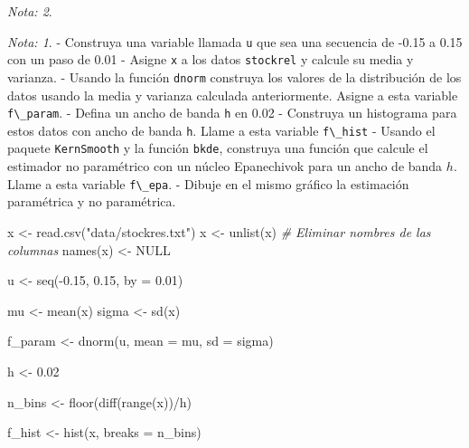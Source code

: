 \documentclass[
  12pt,
]{book}
\newenvironment{Shaded}{\begin{snugshade}}{\end{snugshade}}
\newcommand{\AttributeTok}[1]{\textcolor[rgb]{0.77,0.63,0.00}{#1}}
\newcommand{\CommentTok}[1]{\textcolor[rgb]{0.56,0.35,0.01}{\textit{#1}}}
\newcommand{\ConstantTok}[1]{\textcolor[rgb]{0.00,0.00,0.00}{#1}}
\newcommand{\FloatTok}[1]{\textcolor[rgb]{0.00,0.00,0.81}{#1}}
\newcommand{\FunctionTok}[1]{\textcolor[rgb]{0.00,0.00,0.00}{#1}}
\newcommand{\NormalTok}[1]{#1}
\newcommand{\OtherTok}[1]{\textcolor[rgb]{0.56,0.35,0.01}{#1}}
\newcommand{\SpecialCharTok}[1]{\textcolor[rgb]{0.00,0.00,0.00}{#1}}
\newcommand{\StringTok}[1]{\textcolor[rgb]{0.31,0.60,0.02}{#1}}
\theoremstyle{definition}
\theoremstyle{definition}
\theoremstyle{definition}
\theoremstyle{remark}
\newtheorem*{remark}{Nota: }
\begin{document}
\begin{remark}
\begin{remark}

{}
- Construya una variable llamada \texttt{u} que sea una secuencia de -0.15 a 0.15 con un paso de 0.01
- Asigne \texttt{x} a los datos \texttt{stockrel} y calcule su media y varianza.
- Usando la función \texttt{dnorm} construya los valores de la distribución de los datos usando la media y varianza calculada anteriormente. Asigne a esta variable \texttt{f\textbackslash{}\_param}.
- Defina un ancho de banda \texttt{h} en 0.02
- Construya un histograma para estos datos con ancho de banda \texttt{h}. Llame a esta variable \texttt{f\textbackslash{}\_hist}
- Usando el paquete \texttt{KernSmooth} y la función \texttt{bkde}, construya una función que calcule el estimador no paramétrico con un núcleo Epanechivok para un ancho de banda \(h\). Llame a esta variable \texttt{f\textbackslash{}\_epa}.
- Dibuje en el mismo gráfico la estimación paramétrica y no paramétrica.

\end{remark}
\end{remark}

\begin{Shaded}
\begin{Highlighting}[]
\NormalTok{x }\OtherTok{\textless{}{-}} \FunctionTok{read.csv}\NormalTok{(}\StringTok{"data/stockres.txt"}\NormalTok{)}
\NormalTok{x }\OtherTok{\textless{}{-}} \FunctionTok{unlist}\NormalTok{(x)}
\CommentTok{\# Eliminar nombres de las columnas}
\FunctionTok{names}\NormalTok{(x) }\OtherTok{\textless{}{-}} \ConstantTok{NULL}

\NormalTok{u }\OtherTok{\textless{}{-}} \FunctionTok{seq}\NormalTok{(}\SpecialCharTok{{-}}\FloatTok{0.15}\NormalTok{, }\FloatTok{0.15}\NormalTok{, }\AttributeTok{by =} \FloatTok{0.01}\NormalTok{)}

\NormalTok{mu }\OtherTok{\textless{}{-}} \FunctionTok{mean}\NormalTok{(x)}
\NormalTok{sigma }\OtherTok{\textless{}{-}} \FunctionTok{sd}\NormalTok{(x)}

\NormalTok{f\_param }\OtherTok{\textless{}{-}} \FunctionTok{dnorm}\NormalTok{(u, }\AttributeTok{mean =}\NormalTok{ mu, }\AttributeTok{sd =}\NormalTok{ sigma)}

\NormalTok{h }\OtherTok{\textless{}{-}} \FloatTok{0.02}

\NormalTok{n\_bins }\OtherTok{\textless{}{-}} \FunctionTok{floor}\NormalTok{(}\FunctionTok{diff}\NormalTok{(}\FunctionTok{range}\NormalTok{(x))}\SpecialCharTok{/}\NormalTok{h)}

\NormalTok{f\_hist }\OtherTok{\textless{}{-}} \FunctionTok{hist}\NormalTok{(x, }\AttributeTok{breaks =}\NormalTok{ n\_bins)}
\end{Highlighting}
\end{Shaded}
\end{document}
